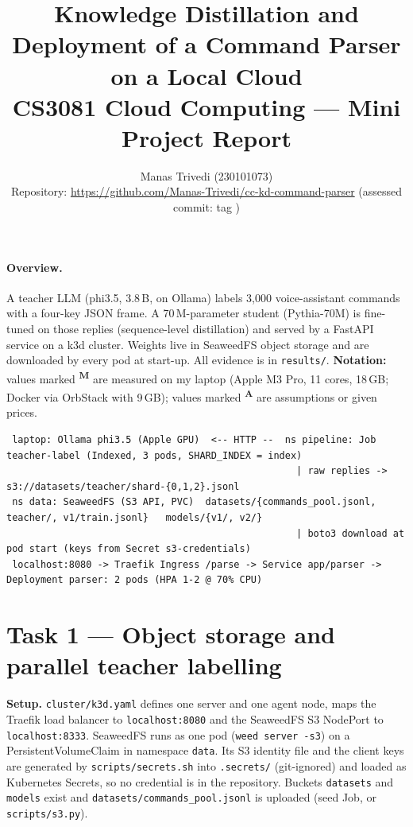 \documentclass[10pt,a4paper]{article}
\title{\vspace{-1.2cm}Knowledge Distillation and Deployment of a Command Parser on a Local Cloud\\
\large CS3081 Cloud Computing --- Mini Project Report}
\author{Manas Trivedi \quad (230101073)\\
\small Repository: \url{https://github.com/Manas-Trivedi/cc-kd-command-parser} \quad (assessed commit: tag \code{final})}
\date{}
\newcommand{\code}[1]{\texttt{\small #1}}
\newcommand{\meas}{\textsuperscript{\textbf{M}}}
\newcommand{\assu}{\textsuperscript{\textbf{A}}}
\begin{document}
\sloppy
\maketitle\vspace{-1cm}

\paragraph{Overview.} A teacher LLM (phi3.5, 3.8\,B, on Ollama) labels 3,000 voice-assistant commands with a
four-key JSON frame. A 70\,M-parameter student (Pythia-70M) is fine-tuned on those replies
(sequence-level distillation) and served by a FastAPI service on a k3d cluster. Weights live in
SeaweedFS object storage and are downloaded by every pod at start-up. All evidence is in \code{results/}.
\textbf{Notation:} values marked \meas{} are measured on my laptop (Apple M3 Pro, 11 cores, 18\,GB; Docker via
OrbStack with 9\,GB); values marked \assu{} are assumptions or given prices.

{\scriptsize
\begin{verbatim}
 laptop: Ollama phi3.5 (Apple GPU)  <-- HTTP --  ns pipeline: Job teacher-label (Indexed, 3 pods, SHARD_INDEX = index)
                                                   | raw replies -> s3://datasets/teacher/shard-{0,1,2}.jsonl
 ns data: SeaweedFS (S3 API, PVC)  datasets/{commands_pool.jsonl, teacher/, v1/train.jsonl}   models/{v1/, v2/}
                                                   | boto3 download at pod start (keys from Secret s3-credentials)
 localhost:8080 -> Traefik Ingress /parse -> Service app/parser -> Deployment parser: 2 pods (HPA 1-2 @ 70% CPU)
\end{verbatim}}

\section{Task 1 --- Object storage and parallel teacher labelling}
\textbf{Setup.} \code{cluster/k3d.yaml} defines one server and one agent node, maps the Traefik load balancer to
\code{localhost:8080} and the SeaweedFS S3 NodePort to \code{localhost:8333}. SeaweedFS runs as one pod
(\code{weed server -s3}) on a PersistentVolumeClaim in namespace \code{data}. Its S3 identity file and the
client keys are generated by \code{scripts/secrets.sh} into \code{.secrets/} (git-ignored) and loaded as
Kubernetes Secrets, so no credential is in the repository. Buckets \code{datasets} and \code{models} exist and
\code{datasets/commands\_pool.jsonl} is uploaded (seed Job, or \code{scripts/s3.py}).
\end{document}
